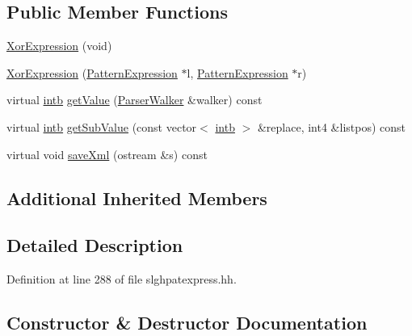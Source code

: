 \subsection*{Public Member Functions}
\begin{DoxyCompactItemize}
\item 
\mbox{\hyperlink{class_xor_expression_a4d4e14419e5c794a516c6b9536757e0d}{Xor\+Expression}} (void)
\item 
\mbox{\hyperlink{class_xor_expression_a80177c9628416b0113febb32e36424aa}{Xor\+Expression}} (\mbox{\hyperlink{class_pattern_expression}{Pattern\+Expression}} $\ast$l, \mbox{\hyperlink{class_pattern_expression}{Pattern\+Expression}} $\ast$r)
\item 
virtual \mbox{\hyperlink{types_8h_aa925ba3e627c2df89d5b1cfe84fb8572}{intb}} \mbox{\hyperlink{class_xor_expression_a2f099da41343681d42dcc1b6c06a88ff}{get\+Value}} (\mbox{\hyperlink{class_parser_walker}{Parser\+Walker}} \&walker) const
\item 
virtual \mbox{\hyperlink{types_8h_aa925ba3e627c2df89d5b1cfe84fb8572}{intb}} \mbox{\hyperlink{class_xor_expression_a36d35fdcd9283efaa711304fed75e9e6}{get\+Sub\+Value}} (const vector$<$ \mbox{\hyperlink{types_8h_aa925ba3e627c2df89d5b1cfe84fb8572}{intb}} $>$ \&replace, int4 \&listpos) const
\item 
virtual void \mbox{\hyperlink{class_xor_expression_a275b64efdd4752af7b69923475286f43}{save\+Xml}} (ostream \&s) const
\end{DoxyCompactItemize}
\subsection*{Additional Inherited Members}


\subsection{Detailed Description}


Definition at line 288 of file slghpatexpress.\+hh.



\subsection{Constructor \& Destructor Documentation}
\mbox{\label{class_xor_expression_a4d4e14419e5c794a516c6b9536757e0d}} 
